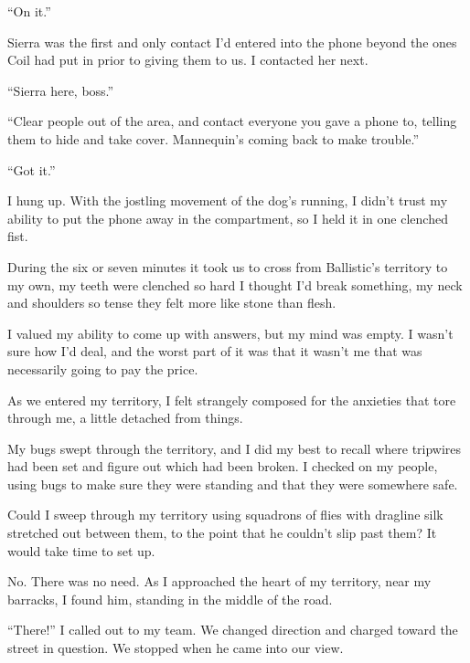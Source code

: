 ``On it.''



Sierra was the first and only contact I'd entered into the phone beyond the ones Coil had put in prior to giving them to us.  I contacted her next.



``Sierra here, boss.''



``Clear people out of the area, and contact everyone you gave a phone to, telling them to hide and take cover.  Mannequin's coming back to make trouble.''



``Got it.''



I hung up.  With the jostling movement of the dog's running, I didn't trust my ability to put the phone away in the compartment, so I held it in one clenched fist.



During the six or seven minutes it took us to cross from Ballistic's territory to my own, my teeth were clenched so hard I thought I'd break something, my neck and shoulders so tense they felt more like stone than flesh.



I valued my ability to come up with answers, but my mind was empty.  I wasn't sure how I'd deal, and the worst part of it was that it wasn't me that was necessarily going to pay the price.



As we entered my territory, I felt strangely composed for the anxieties that tore through me, a little detached from things.



My bugs swept through the territory, and I did my best to recall where tripwires had been set and figure out which had been broken.  I checked on my people, using bugs to make sure they were standing and that they were somewhere safe.



Could I sweep through my territory using squadrons of flies with dragline silk stretched out between them, to the point that he couldn't slip past them?  It would take time to set up.



No.  There was no need.  As I approached the heart of my territory, near my barracks, I found him, standing in the middle of the road.



``There!'' I called out to my team.  We changed direction and charged toward the street in question.  We stopped when he came into our view.



